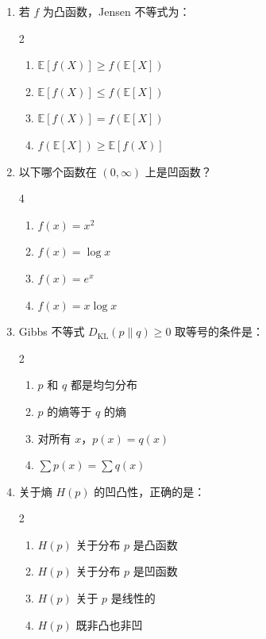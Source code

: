 \documentclass[12pt,a4paper]{ctexart}
\newcommand{\EE}{\mathbb{E}}
\newcommand{\DKL}{D_{\mathrm{KL}}}
\begin{document}
\begin{enumerate}[label=\arabic*., leftmargin=*]

\item 若 $f$ 为凸函数，Jensen 不等式为：
\begin{multicols}{2}
\begin{enumerate}[label=(\Alph*)]
  \item $\EE[f(X)] \geq f(\EE[X])$
  \item $\EE[f(X)] \leq f(\EE[X])$
  \item $\EE[f(X)] = f(\EE[X])$
  \item $f(\EE[X]) \geq \EE[f(X)]$
\end{enumerate}
\end{multicols}

\item 以下哪个函数在 $(0, \infty)$ 上是凹函数？
\begin{multicols}{4}
\begin{enumerate}[label=(\Alph*)]
  \item $f(x) = x^2$
  \item $f(x) = \log x$
  \item $f(x) = e^x$
  \item $f(x) = x\log x$
\end{enumerate}
\end{multicols}

\item Gibbs 不等式 $\DKL(p\|q) \geq 0$ 取等号的条件是：
\begin{multicols}{2}
\begin{enumerate}[label=(\Alph*)]
  \item $p$ 和 $q$ 都是均匀分布
  \item $p$ 的熵等于 $q$ 的熵
  \item 对所有 $x$，$p(x) = q(x)$
  \item $\sum p(x) = \sum q(x)$
\end{enumerate}
\end{multicols}

\item 关于熵 $H(p)$ 的凹凸性，正确的是：
\begin{multicols}{2}
\begin{enumerate}[label=(\Alph*)]
  \item $H(p)$ 关于分布 $p$ 是凸函数
  \item $H(p)$ 关于分布 $p$ 是凹函数
  \item $H(p)$ 关于 $p$ 是线性的
  \item $H(p)$ 既非凸也非凹
\end{enumerate}
\end{multicols}


\end{enumerate}
\end{document}
